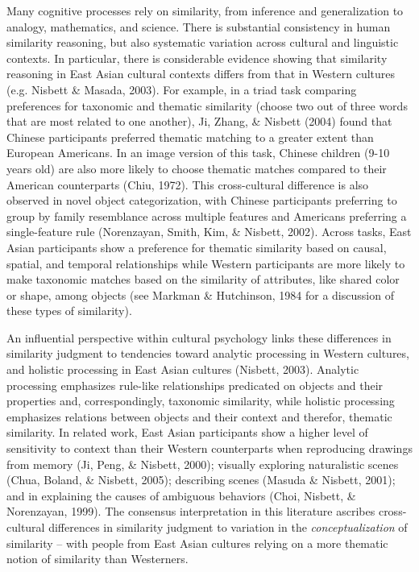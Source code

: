 \documentclass[10pt, letterpaper]{article}
\begin{document}
Many cognitive processes rely on similarity, from inference and
generalization to analogy, mathematics, and science. There is
substantial consistency in human similarity reasoning, but also
systematic variation across cultural and linguistic contexts. In
particular, there is considerable evidence showing that similarity
reasoning in East Asian cultural contexts differs from that in Western
cultures (e.g. Nisbett \& Masada, 2003). For example, in a triad task
comparing preferences for taxonomic and thematic similarity (choose two
out of three words that are most related to one another), Ji, Zhang, \&
Nisbett (2004) found that Chinese participants preferred thematic
matching to a greater extent than European Americans. In an image
version of this task, Chinese children (9-10 years old) are also more
likely to choose thematic matches compared to their American
counterparts (Chiu, 1972). This cross-cultural difference is also
observed in novel object categorization, with Chinese participants
preferring to group by family resemblance across multiple features and
Americans preferring a single-feature rule (Norenzayan, Smith, Kim, \&
Nisbett, 2002). Across tasks, East Asian participants show a preference
for thematic similarity based on causal, spatial, and temporal
relationships while Western participants are more likely to make
taxonomic matches based on the similarity of attributes, like shared
color or shape, among objects (see Markman \& Hutchinson, 1984 for a
discussion of these types of similarity).

An influential perspective within cultural psychology links these
differences in similarity judgment to tendencies toward analytic
processing in Western cultures, and holistic processing in East Asian
cultures (Nisbett, 2003). Analytic processing emphasizes rule-like
relationships predicated on objects and their properties and,
correspondingly, taxonomic similarity, while holistic processing
emphasizes relations between objects and their context and therefor,
thematic similarity. In related work, East Asian participants show a
higher level of sensitivity to context than their Western counterparts
when reproducing drawings from memory (Ji, Peng, \& Nisbett, 2000);
visually exploring naturalistic scenes (Chua, Boland, \& Nisbett, 2005);
describing scenes (Masuda \& Nisbett, 2001); and in explaining the
causes of ambiguous behaviors (Choi, Nisbett, \& Norenzayan, 1999). The
consensus interpretation in this literature ascribes cross-cultural
differences in similarity judgment to variation in the
\emph{conceptualization} of similarity -- with people from East Asian
cultures relying on a more thematic notion of similarity than
Westerners.
\end{document}
